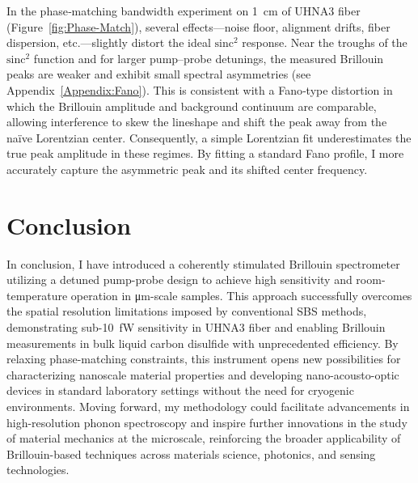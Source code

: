 In the phase‐matching bandwidth experiment on \SI{1}{\centi\meter} of \ac{UHNA3} fiber (Figure~\ref{fig:Phase-Match}), several effects—noise floor, alignment drifts, fiber dispersion, etc.—slightly distort the ideal \(\mathrm{sinc^{2}}\) response. Near the troughs of the \(\mathrm{sinc^{2}}\) function and for larger pump–probe detunings, the measured Brillouin peaks are weaker and exhibit small spectral asymmetries (see Appendix~\ref{Appendix:Fano}). This is consistent with a Fano‐type distortion in which the Brillouin amplitude and background continuum are comparable, allowing interference to skew the lineshape and shift the peak away from the naïve Lorentzian center. Consequently, a simple Lorentzian fit underestimates the true peak amplitude in these regimes. By fitting a standard Fano profile, I more accurately capture the asymmetric peak and its shifted center frequency.

\section{Conclusion}
\label{Conclusion}

In conclusion, I have introduced a coherently stimulated Brillouin spectrometer utilizing a detuned pump-probe design to achieve high sensitivity and room-temperature operation in \si{\micro\meter}-scale samples. This approach successfully overcomes the spatial resolution limitations imposed by conventional \ac{SBS} methods, demonstrating sub-\SI{10}{\femto\watt} sensitivity in \ac{UHNA3} fiber and enabling Brillouin measurements in bulk liquid carbon disulfide with unprecedented efficiency. By relaxing phase-matching constraints, this instrument opens new possibilities for characterizing nanoscale material properties and developing nano-acousto-optic devices in standard laboratory settings without the need for cryogenic environments. Moving forward, my methodology could facilitate advancements in high-resolution phonon spectroscopy and inspire further innovations in the study of material mechanics at the microscale, reinforcing the broader applicability of Brillouin-based techniques across materials science, photonics, and sensing technologies.
